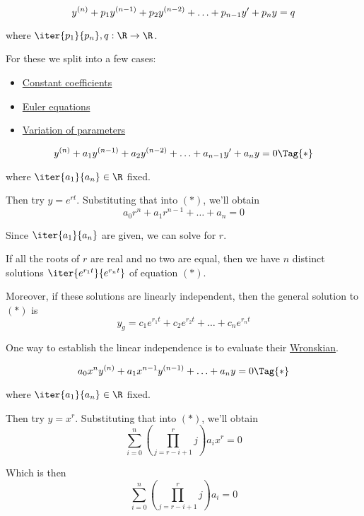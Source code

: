 
\begin{equation*}
  \def\y#1{y^{(#1)}}
  \y n+p_1\y{n-1}+p_2\y{n-2}+\ldots+p_{n-1}y'+p_ n y=q
\end{equation*}

where $\iter{p_1}{p_n},q:\R\to\R$.

For these we split into a few cases:
\begin{itemize}
  \item\href{cd8a29a}{Constant coefficients}
  \item\href{a0f8e0c}{Euler equations}
  \item\href{de785b7}{Variation of parameters}
\end{itemize}

\label{cd8a29a}


\begin{equation*}
  \def\y#1{y^{(#1)}}
  \y n+a_1\y{n-1}+a_2\y{n-2}+\ldots+a_{n-1}y'+a_ny=0\Tag{*}
\end{equation*}

where $\iter{a_1}{a_n}\in\R$ fixed.

Then try $y=e^{rt}$. Substituting that into $(*)$, we'll obtain
$$
  a_0r^n+a_1r^{n-1}+\ldots+a_n=0
$$

Since $\iter{a_1}{a_n}$ are given, we can solve for $r$.

If all the roots of $r$ are real and no two are equal, then we have $n$
distinct solutions $\iter{e^{r_1t}}{e^{r_nt}}$ of equation $(*)$.

Moreover, if these solutions are linearly independent, then the general
solution to $(*)$ is
$$
  y_g=c_1e^{r_1t}+c_2e^{r_2t}+\ldots+c_ne^{r_nt}
$$

One way to establish the linear independence is to evaluate their
\href{b70073b}{Wronskian}.

\label{a0f8e0c}

\begin{equation*}
  \def\y#1{x^{#1}y^{(#1)}}
  a_0\y{n}+a_1\y{n-1}+\ldots+a_ny=0\Tag{*}
\end{equation*}

where $\iter{a_1}{a_n}\in\R$ fixed.

Then try $y=x^{r}$. Substituting that into $(*)$, we'll obtain
$$
  \sum_{i=0}^n\left(\prod_{j=r-i+1}^rj\right) a_ix^r=0
$$

Which is then
$$
  \sum_{i=0}^n\left(\prod_{j=r-i+1}^rj\right) a_i=0
$$

